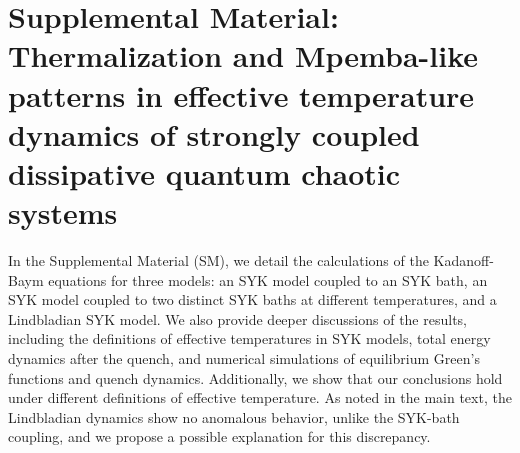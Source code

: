 
\section{\Large Supplemental Material: Thermalization and Mpemba-like patterns in effective temperature dynamics of strongly coupled dissipative quantum chaotic systems}

\maketitle


%
%

\bigskip
In the Supplemental Material (SM), we detail the calculations of the Kadanoff-Baym equations for three models: an SYK model coupled to an SYK bath, an SYK model coupled to two distinct SYK baths at different temperatures, and a Lindbladian SYK model. We also provide deeper discussions of the results, including the definitions of effective temperatures in SYK models, total energy dynamics after the quench, and numerical simulations of equilibrium Green's functions and quench dynamics. Additionally, we show that our conclusions hold under different definitions of effective temperature. As noted in the main text, the Lindbladian dynamics show no anomalous behavior, unlike the SYK-bath coupling, and we propose a possible explanation for this discrepancy.






